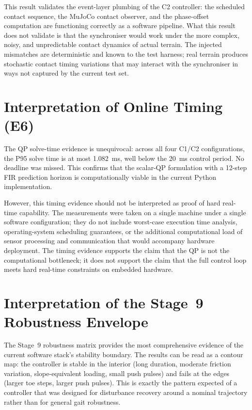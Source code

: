 \documentclass[12pt,a4paper]{report}
\begin{document}
This result validates the event-layer plumbing of the C2 controller: the scheduled contact sequence, the MuJoCo contact observer, and the phase-offset computation are functioning correctly as a software pipeline. What this result does not validate is that the synchroniser would work under the more complex, noisy, and unpredictable contact dynamics of actual terrain. The injected mismatches are deterministic and known to the test harness; real terrain produces stochastic contact timing variations that may interact with the synchroniser in ways not captured by the current test set.
 
\section{Interpretation of Online Timing (E6)}
 
The QP solve-time evidence is unequivocal: across all four C1/C2 configurations, the P95 solve time is at most \SI{1.082}{\milli\second}, well below the \SI{20}{\milli\second} control period. No deadline was missed. This confirms that the scalar-QP formulation with a 12-step FIR prediction horizon is computationally viable in the current Python implementation.
 
However, this timing evidence should not be interpreted as proof of hard real-time capability. The measurements were taken on a single machine under a single software configuration; they do not include worst-case execution time analysis, operating-system scheduling guarantees, or the additional computational load of sensor processing and communication that would accompany hardware deployment. The timing evidence supports the claim that the QP is not the computational bottleneck; it does not support the claim that the full control loop meets hard real-time constraints on embedded hardware.
 
\section{Interpretation of the Stage~9 Robustness Envelope}
 
The Stage~9 robustness matrix provides the most comprehensive evidence of the current software stack's stability boundary. The results can be read as a contour map: the controller is stable in the interior (long duration, moderate friction variation, slope-equivalent loading, small push pulses) and fails at the edges (larger toe steps, larger push pulses). This is exactly the pattern expected of a controller that was designed for disturbance recovery around a nominal trajectory rather than for general gait robustness.
 
\end{document}
